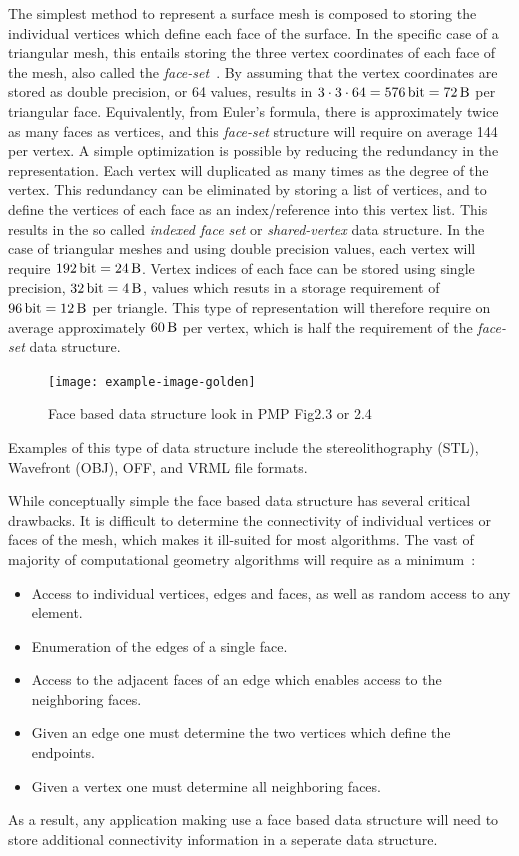 The simplest method to represent a surface mesh is composed to storing the individual vertices which define each face of the surface.
In the specific case of a triangular mesh, this entails storing the three vertex coordinates of each face of the mesh, also called the \textit{face-set}~\cite{botsch2010}.
By assuming that the vertex coordinates are stored as double precision, or \SI{64}{\bit} values, results in \( 3 \cdot 3 \cdot 64 = \SI{576}{\bit} = \SI{72}{\byte}\) per triangular face.
Equivalently, from Euler's formula, there is approximately twice as many faces as vertices, and this \textit{face-set} structure will require on average \SI{144}{\byte} per vertex.
A simple optimization is possible by reducing the redundancy in the representation.
Each vertex will duplicated as many times as the degree of the vertex.
This redundancy can be eliminated by storing a list of vertices, and to define the vertices of each face as an index/reference into this vertex list.
This results in the so called \textit{indexed face set} or \textit{shared-vertex} data structure.
In the case of triangular meshes and using double precision values, each vertex will require \(\SI{192}{\bit} = \SI{24}{\byte}\).
Vertex indices of each face can be stored using single precision, \( \SI{32}{\bit} = \SI{4}{\byte}\), values which resuts in a storage requirement of \( \SI{96}{\bit} = \SI{12}{\byte}\) per triangle.
This type of representation will therefore require on average approximately \( \SI{60}{\byte} \) per vertex, which is half the requirement of the \textit{face-set} data structure.
\begin{figure}
    \centering
    \texttt{[image: example-image-golden]}
    \caption{Face based data structure look in PMP Fig2.3 or 2.4~\label{fig:face_based_data_structure}}
\end{figure}
Examples of this type of data structure include the stereolithography (STL), Wavefront (OBJ), OFF, and VRML file formats.

While conceptually simple the face based data structure has several critical drawbacks.
It is difficult to determine the connectivity of individual vertices or faces of the mesh, which makes it ill-suited for most algorithms.
The vast of majority of computational geometry algorithms will require as a minimum~\cite{botsch2010}:
\begin{itemize}
    \item Access to individual vertices, edges and faces, as well as random access to any element.
    \item Enumeration of the edges of a single face.
    \item Access to the adjacent faces of an edge which enables access to the neighboring faces.
    \item Given an edge one must determine the two vertices which define the endpoints.
    \item Given a vertex one must determine all neighboring faces.
\end{itemize}
As a result, any application making use a face based data structure will need to store additional connectivity information in a seperate data structure.

